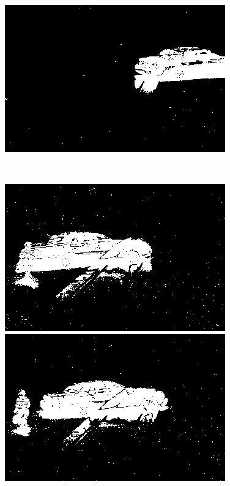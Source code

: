 \documentclass[a4paper]{ctexart}
\begin{document}
\begin{figure}[htbp]
\begin{minipage}[t]{0.2\textwidth}
	\end{minipage}
	\begin{minipage}[t]{0.2\textwidth}
		\centering
		\includegraphics[width=\textwidth]{figure/frames/single_gT01415.jpg}
	\end{minipage}\\
	\begin{minipage}[t]{0.2\textwidth}
		\centering
		\includegraphics[width=\textwidth]{figure/frames/single_gN20400.jpg}
	\end{minipage}
	\begin{minipage}[t]{0.2\textwidth}
		\centering
		\includegraphics[width=\textwidth]{figure/frames/single_gN20405.jpg}

\end{minipage}
\end{figure}
\end{document}
